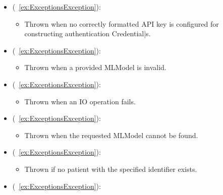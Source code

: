 \begin{itemize}[nolistsep,noitemsep]
\item {} (\iconinher{}~\ref{ex:ExceptionsException}): 
\begin{itemize}[noitemsep,nolistsep]

\item[] Thrown when no correctly formatted API key is configured for constructing authentication Credential|s.
\end{itemize}

\item {} (\iconinher{}~\ref{ex:ExceptionsException}): 
\begin{itemize}[noitemsep,nolistsep]

\item[] Thrown when a provided MLModel is invalid.
\end{itemize}

\item {} (\iconinher{}~\ref{ex:ExceptionsException}): 
\begin{itemize}[noitemsep,nolistsep]

\item[] Thrown when an IO operation fails.
\end{itemize}

\item {} (\iconinher{}~\ref{ex:ExceptionsException}): 
\begin{itemize}[noitemsep,nolistsep]

\item[] Thrown when the requested MLModel cannot be found.
\end{itemize}

\item {} (\iconinher{}~\ref{ex:ExceptionsException}): 
\begin{itemize}[noitemsep,nolistsep]

\item[] Thrown if no patient with the specified identifier exists.
\end{itemize}

\item {} (\iconinher{}~\ref{ex:ExceptionsException}): 
\begin{itemize}


\end{itemize}
\end{itemize}

